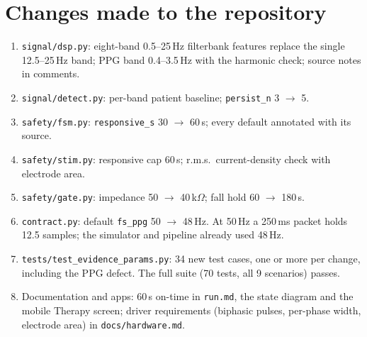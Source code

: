 \documentclass[10pt,a4paper]{article}
\newcommand{\code}[1]{\texttt{\small #1}}
\begin{document}
\section{Changes made to the repository}\label{sec:changes}
\begin{enumerate}
  \item \code{signal/dsp.py}: eight-band 0.5--25\,Hz filterbank features replace the single 12.5--25\,Hz band; PPG band
        0.4--3.5\,Hz with the harmonic check; source notes in comments.
  \item \code{signal/detect.py}: per-band patient baseline; \code{persist\_n} 3 $\rightarrow$ 5.
  \item \code{safety/fsm.py}: \code{responsive\_s} 30 $\rightarrow$ 60\,s; every default annotated with its source.
  \item \code{safety/stim.py}: responsive cap 60\,s; r.m.s.\ current-density check with electrode area.
  \item \code{safety/gate.py}: impedance 50 $\rightarrow$ 40\,k$\Omega$; fall hold 60 $\rightarrow$ 180\,s.
  \item \code{contract.py}: default \code{fs\_ppg} 50 $\rightarrow$ 48\,Hz. At 50\,Hz a 250\,ms packet holds 12.5
        samples; the simulator and pipeline already used 48\,Hz.
  \item \code{tests/test\_evidence\_params.py}: 34 new test cases, one or more per change, including the PPG defect.
        The full suite (70 tests, all 9 scenarios) passes.
  \item Documentation and apps: 60\,s on-time in \code{run.md}, the state diagram and the mobile Therapy screen; driver
        requirements (biphasic pulses, per-phase width, electrode area) in \code{docs/hardware.md}.
\end{enumerate}

\end{document}
